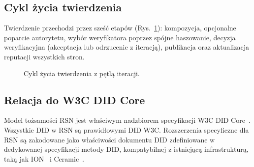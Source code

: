 \documentclass[11pt,a4paper,twocolumn]{article}
\begin{document}
\subsection{Cykl życia twierdzenia}

Twierdzenie przechodzi przez sześć etapów (Rys.~\ref{fig:lifecycle}): kompozycja, opcjonalne poparcie autorytetu, wybór weryfikatora poprzez spójne haszowanie, decyzja weryfikacyjna (akceptacja lub odrzucenie z iteracją), publikacja oraz aktualizacja reputacji wszystkich stron.

\begin{figure}[ht]
\centering
{}
\caption{Cykl życia twierdzenia z pętlą iteracji.}
\label{fig:lifecycle}
\end{figure}

\subsection{Relacja do W3C DID Core}

Model tożsamości RSN jest właściwym nadzbiorem specyfikacji W3C DID Core~\cite{did2022}. Wszystkie DID w RSN są prawidłowymi DID W3C. Rozszerzenia specyficzne dla RSN są zakodowane jako właściwości dokumentu DID zdefiniowane w dedykowanej specyfikacji metody DID, kompatybilnej z istniejącą infrastrukturą, taką jak ION~\cite{buchner2021} i Ceramic~\cite{ceramic2023}.
\end{document}
